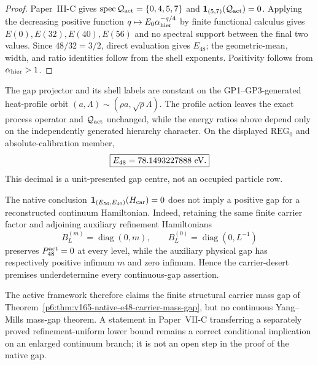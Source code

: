 \documentclass[12pt,a4paper]{article}
\begin{document}
\begin{proof}
Paper~III-C gives
\(\operatorname{spec}\mathcal Q_{\rm act}=\{0,4,5,7\}\) and
\(\mathbf1_{(5,7)}(\mathcal Q_{\rm act})=0\).  Applying the decreasing
positive function \(q\mapsto E_0\alpha_{\rm hier}^{-q/4}\) by finite
functional calculus gives
\(E(0),E(32),E(40),E(56)\) and no spectral support between the final two
values.  Since \(48/32=3/2\), direct evaluation gives \(E_{48}\); the
geometric-mean, width, and ratio identities follow from the shell exponents.
Positivity follows from \(\alpha_{\rm hier}>1\).
\end{proof}

\begin{corollary}
\label{p6:cor:v165-native-gap-profile-invariance}
The gap projector and its shell labels are constant on the GP1--GP3-generated
heat-profile orbit
\((a,\Lambda)\sim(\rho a,\sqrt\rho\Lambda)\).  The profile action leaves the
exact process operator and \(\mathcal Q_{\rm act}\) unchanged, while the
energy ratios above depend only on the independently generated hierarchy
character.  On the displayed \(\mathrm{REG}_0\) and absolute-calibration
member,
\begin{equation}
 \label{p6:eq:v165-e48-numerical-coordinate}
 \boxed{E_{48}=78.1493227888\ {\rm eV}.}
\end{equation}
This decimal is a unit-presented gap centre, not an occupied particle row.
\end{corollary}

\begin{theorem}
\label{p6:thm:v165-no-continuum-gap-promotion}
The native conclusion
\(\mathbf1_{(E_{56},E_{40})}(H_{\rm car})=0\) does not imply a positive
gap for a reconstructed continuum Hamiltonian.  Indeed, retaining the same
finite carrier factor and adjoining auxiliary refinement Hamiltonians
\[
 B_L^{(m)}=\operatorname{diag}(0,m),
 \qquad
 B_L^{(0)}=\operatorname{diag}(0,L^{-1})
\]
preserves \(P_{48}^{\rm act}=0\) at every level, while the auxiliary physical
gap has respectively positive infimum \(m\) and zero infimum.  Hence the
carrier-desert premises underdetermine every continuous-gap assertion.

The active framework therefore claims the finite structural carrier mass gap
of Theorem~\ref{p6:thm:v165-native-e48-carrier-mass-gap}, but no continuous
Yang--Mills mass-gap theorem.  A statement in Paper~VII-C transferring a
separately proved refinement-uniform lower bound remains a correct
conditional implication on an enlarged continuum branch; it is not an open
step in the proof of the native gap.
\end{theorem}
\end{document}
